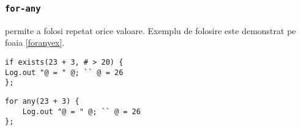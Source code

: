 \subsubsection{\lstinline|for-any|}

 permite a folosi repetat orice valoare. Exemplu de folosire este demonstrat pe foaia \ref{foranyex}.

\begin{lstlisting}[caption=Folosirea if-exist-ului, label=ifexistsex]
if exists(23 + 3, # > 20) {
Log.out "@ = " @; `` @ = 26
};
\end{lstlisting}

\begin{lstlisting}[caption=Folosirea for-any-ului, label=foranyex]
for any(23 + 3) {
	Log.out "@ = " @; `` @ = 26
};
\end{lstlisting}
